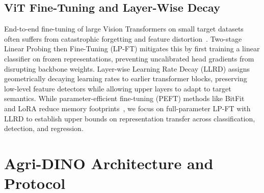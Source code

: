 \documentclass[10pt,twocolumn,letterpaper]{article}
\begin{document}
\subsection{ViT Fine-Tuning and Layer-Wise Decay}
End-to-end fine-tuning of large Vision Transformers on small target datasets often suffers from catastrophic forgetting and feature distortion~\cite{kumar2022fine}. Two-stage Linear Probing then Fine-Tuning (LP-FT) mitigates this by first training a linear classifier on frozen representations, preventing uncalibrated head gradients from disrupting backbone weights. Layer-wise Learning Rate Decay (LLRD) assigns geometrically decaying learning rates to earlier transformer blocks, preserving low-level feature detectors while allowing upper layers to adapt to target semantics. While parameter-efficient fine-tuning (PEFT) methods like BitFit~\cite{ben2022bitfit} and LoRA reduce memory footprints~\cite{bafghi2024peft}, we focus on full-parameter LP-FT with LLRD to establish upper bounds on representation transfer across classification, detection, and regression.

\section{Agri-DINO Architecture and Protocol}
\end{document}
